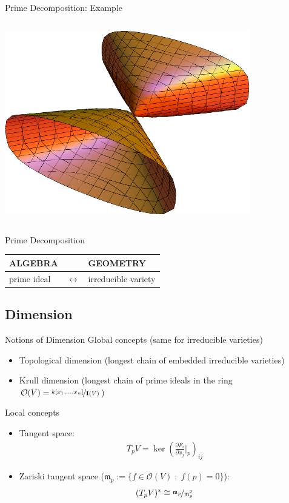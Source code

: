 \documentclass[notes=hide]{beamer}
\newcommand{\I}{\mathbf{I}}
\newcommand{\mvar}[2]{#1_1,\ldots , #1_{#2}}
\newcommand{\kxn}{k[\mvar{x}{n}]}
\begin{document}
\begin{frame}{Prime Decomposition: Example}
\begin{columns}[onlytextwidth]
\begin{column}{0.4\textwidth}
\includegraphics[width=0.8\textwidth]{complvar2}
	\end{column}
\end{columns}
\end{frame}

\begin{frame}{Prime Decomposition}
\begin{center}
\begin{tabular}{>{\Centering}p{} >{\Centering}p{} >{\Centering}p{} }
\toprule
\textbf{ALGEBRA} & & \textbf{GEOMETRY}\\
\midrule
prime ideal &$\leftrightarrow$ & irreducible variety\\
\bottomrule
\end{tabular}
\end{center}
\end{frame}



\subsection{Dimension}
\begin{frame}{Notions of Dimension}
Global concepts (same for irreducible varieties)\pause
\begin{itemize}[<+->]
\item Topological dimension (longest chain of embedded irreducible varieties)
\item Krull dimension (longest chain of prime ideals in the ring $\mathcal{O} (V) = \nicefrac{\kxn}{\I (V)}$)
\end{itemize}\pause
Local concepts
\begin{itemize}[<+->]
\item Tangent space:
\begin{align*}
T_p V = \ker \left( \frac{\partial F_i}{\partial x_j}\bigg|_p  \right)_{ij}
\end{align*}
\item Zariski tangent space ($\mathfrak{m}_p := \{ f \in \mathcal{O}(V) \; : \; f(p)=0\}$):
\begin{align*}
(T_p V)^* \cong \nicefrac{\mathfrak{m}_p}{\mathfrak{m}^2_p}
\end{align*}
\end{itemize}
\end{frame}
\end{document}
